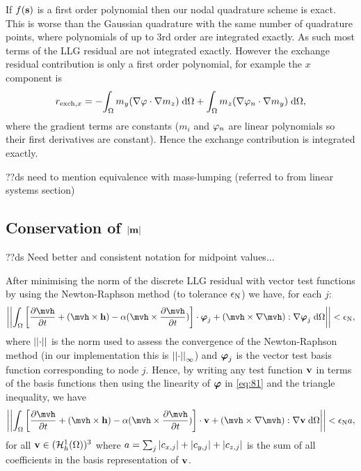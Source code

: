 {If $f({\boldsymbol{\mathrm{s}}})$ is a first order polynomial then our nodal quadrature scheme is exact.
This is worse than the Gaussian quadrature with the same number of quadrature points, where polynomials of up to 3rd order are integrated exactly.
As such most terms of the LLG residual are not integrated exactly.
However the exchange residual contribution is only a first order polynomial, for example the $x$ component is
\begin{equation}
  \begin{aligned}
    r_{\text{exch},x} = - {\int_{\Omega} { m_y {\left( \nabla \varphi \cdot \nabla m_z \right)}} {\; \mathrm{{d}}} {\Omega}} + {\int_{\Omega} { m_z {\left( \nabla \varphi_n \cdot \nabla m_y \right)}} {\; \mathrm{{d}}} {\Omega}},
  \end{aligned}
\end{equation}
where the gradient terms are constants ($m_i$ and $\varphi_n$ are linear polynomials so their first derivatives are constant).
Hence the exchange contribution is integrated exactly.


??ds need to mention equivalence with mass-lumping (referred to from linear systems section)

\subsection{Conservation of $\left|{\boldsymbol{\mathrm{m}}} \right|$}
\label{sec:weak-cons-absmv}

??ds Need better and consistent notation for midpoint values...

After minimising the norm of the discrete LLG residual with vector test functions by using the Newton-Raphson method (to tolerance $\epsilon_{\mathrm{N}}$) we have, for each $j$:
\begin{equation}
  \norm{\intd{ \bigs{\dmdth  + (\mvh \times \hv) - \dampc (\mvh \times \dmdth)} \cdot \tbfv_j + \bigb{\mvh \times \grad \mvh} : \grad \tbfv_j}} < \ntol,
  \label{eq:81}
\end{equation}
where $\left| \left| \cdot \right| \right|$ is the norm used to assess the convergence of the Newton-Raphson method (in our implementation this is $\left| \left| \cdot \right| \right|_\infty$) and $\boldsymbol{\mathrm{\varphi}}_j$ is the vector test basis function corresponding to node $j$.
Hence, by writing any test function $\boldsymbol{\mathrm{v}}$ in terms of the basis functions then using the linearity of $\boldsymbol{\mathrm{\varphi}}$ in \cref{eq:81} and the triangle inequality, we have
\begin{equation}
  \norm{\intd{ \bigs{\dmdth  + (\mvh \times \hv) - \dampc (\mvh \times \dmdth)} \cdot \testv + \bigb{\mvh \times \grad \mvh} : \grad \testv}} < \ntol  \sumbasiscoeff,
  \label{eq:82}
\end{equation}
for all $\boldsymbol{\mathrm{v}} \in ({\mathcal{H}^1_h(\Omega)})^3$ where $a = \sum_j  \left|{c_{x,j}} \right| + \left|{c_{y,j}} \right| + \left|{c_{z,j}} \right|$ is the sum of all coefficients in the basis representation of $\boldsymbol{\mathrm{v}}$.

}
